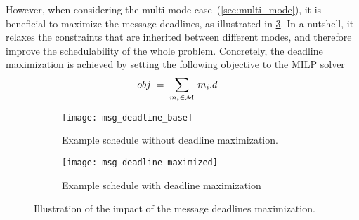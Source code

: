 However, when considering the multi-mode case~(\cref{sec:multi_mode}), it is beneficial to maximize the message deadlines, as illustrated in \cref{fig:msg_deadline_maximization}.
In a nutshell, it relaxes the constraints that are inherited between different modes, and therefore improve the schedulability of the whole problem.
Concretely, the deadline maximization is achieved by setting the following objective to the MILP solver
\begin{align}
&obj \; = \; \sum_{m_i\in \mathcal{M}} \, m_i.d
\end{align}


\begin{figure}
	\begin{subfigure}[t]{.48\linewidth}
	\centering
	\texttt{[image: msg\_deadline\_base]}
	\caption{%
	Example schedule without deadline maximization.
	}
	\label{subfig:msg_deadline_base}
	\end{subfigure}%
	\hfill
	\begin{subfigure}[t]{.48\linewidth}
	\centering
	\texttt{[image: msg\_deadline\_maximized]}
	\caption{%
	Example schedule with deadline maximization}
	\label{subfig:msg_deadline_maximized}
	\end{subfigure}
	\caption{Illustration of the impact of the message deadlines maximization.
	}
	\label{fig:msg_deadline_maximization}
\end{figure}
